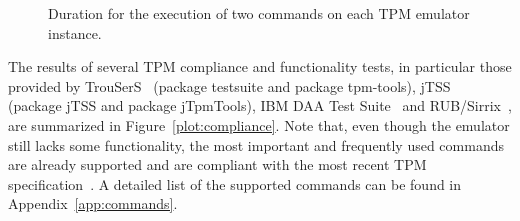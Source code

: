 \documentclass[runningheads]{llncs}
\begin{document}
\begin{figure}
	\begin{center}
		\quad%
		\vspace*{-3mm}
		\caption{Duration for the execution of two commands on each TPM emulator
			instance.}
		\label{plot:execution_time}
	\end{center}
\end{figure}

The results of several TPM compliance and functionality tests, in particular
those provided by TrouSerS~\cite{trousers} (package testsuite and package
tpm-tools), jTSS~\cite{jTSS} (package jTSS and package jTpmTools),
IBM DAA Test Suite~\cite{ibmdaatest} and
RUB/Sirrix~\cite{Sadeghi}, are summarized in Figure~\ref{plot:compliance}.
Note that, even though the emulator still lacks some functionality,
the most important and frequently used commands are already supported and
are compliant with the most recent TPM specification~\cite{TPM}.
A detailed list of the supported commands can be found in
Appendix~\ref{app:commands}.
\end{document}
